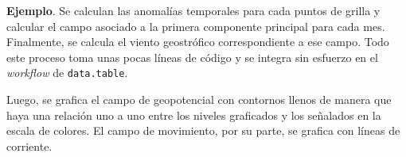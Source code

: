 \documentclass[runningheads]{llncs}\usepackage{knitr}
\begin{document}
\textbf{Ejemplo}. Se calculan las anomalías temporales para cada puntos de grilla y calcular el campo asociado a la primera componente principal para cada mes. Finalmente, se calcula el viento geostrófico correspondiente a ese campo. Todo este proceso toma unas pocas líneas de código y se integra sin esfuerzo en el \emph{workflow} de \texttt{data.table}. 

\begin{knitrout}
\color{fgcolor}\begin{kframe}
\begin{alltt}
\hlstd{geopotential[, gh.t} \hlkwb{:=}   \hlstd{=}  \hlstd{(date))]}
\hlstd{geopotential[, gh.t.w} \hlkwb{:=} \hlopt{*}\hlstd{(}\hlopt{*}\hlopt{/}\hlstd{))]}
 \hlkwb{<-} \hlstd{geopotential[,}  \hlopt{~}  \hlopt{|}  \hlopt{+}   \hlstd{=} \hlstd{)}\hlopt{$}
                     \hlstd{=} \hlstd{(}\hlstd{(date))]}
\hlstd{eof[,} \hlstd{(}\hlstd{,} \hlstd{)} \hlkwb{:=} 
     \hlstd{=} \hlstd{(month)]}
\end{alltt}
\end{kframe}
\end{knitrout}

Luego, se grafica el campo de geopotencial con contornos llenos de manera que haya una relación uno a uno entre los niveles graficados y los señalados en la escala de colores. El campo de movimiento, por su parte, se grafica con líneas de corriente. 
\end{document}
